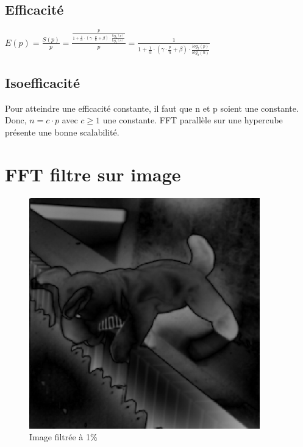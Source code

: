 \documentclass[a4paper]{article}
\begin{document}
\subsection{Efficacité}
\begin{center}
$E(p) = \frac{S(p)}{p} = \frac{\frac{p}{1 + \frac{1}{\alpha} \cdot ( \gamma \cdot \frac{p}{n} + \beta) \cdot \frac{log_2(p)}{log_2(n)}}}{p} = \frac{1}{1 + \frac{1}{\alpha} \cdot ( \gamma \cdot \frac{p}{n} + \beta) \cdot \frac{log_2(p)}{log_2(n)}}$
\end{center}

\subsection{Isoefficacité}
Pour atteindre une efficacité constante, il faut que n et p soient une constante. Donc, $n = c \cdot p $ avec $c \ge 1$ une constante.
FFT parallèle sur une hypercube présente une bonne scalabilité.

\newpage

\section{FFT filtre sur image}

\begin{figure}[!ht]
    \center
    \includegraphics[width=10cm]{../images/evert_filtre_01.eps}
    \caption{Image filtrée à 1\%}
\end{figure}
\end{document}
